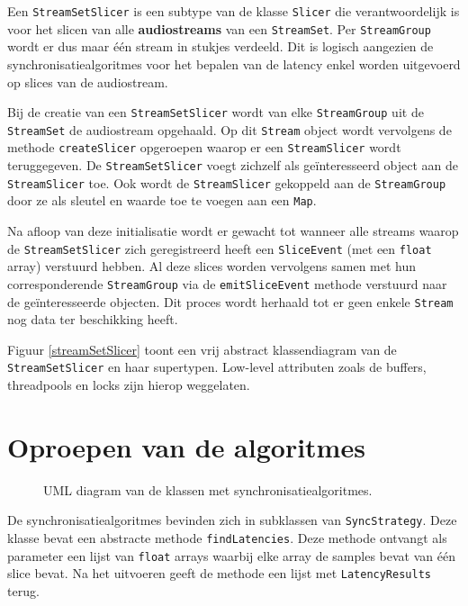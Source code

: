 Een \texttt{StreamSetSlicer} is een subtype van de klasse \texttt{Slicer} die verantwoordelijk is voor het slicen van alle \textbf{audiostreams} van een \texttt{StreamSet}. Per \texttt{StreamGroup} wordt er dus maar één stream in stukjes verdeeld. Dit is logisch aangezien de synchronisatiealgoritmes voor het bepalen van de latency enkel worden uitgevoerd op slices van de audiostream.

Bij de creatie van een \texttt{StreamSetSlicer} wordt van elke \texttt{StreamGroup} uit de \texttt{StreamSet} de audiostream opgehaald. Op dit \texttt{Stream} object wordt vervolgens de methode \texttt{createSlicer} opgeroepen waarop er een \texttt{StreamSlicer} wordt teruggegeven. De \texttt{StreamSetSlicer} voegt zichzelf als geïnteresseerd object aan de \texttt{StreamSlicer} toe. Ook wordt de \texttt{StreamSlicer}
gekoppeld aan de \texttt{StreamGroup} door ze als sleutel en waarde toe te voegen aan een \texttt{Map}.

Na afloop van deze initialisatie wordt er gewacht tot wanneer alle streams waarop de \texttt{StreamSetSlicer} zich geregistreerd heeft een \texttt{SliceEvent} (met een \texttt{float} array) verstuurd hebben. Al deze slices worden vervolgens samen met hun corresponderende \texttt{StreamGroup} via de \texttt{emitSliceEvent} methode verstuurd naar de geïnteresseerde objecten. Dit proces wordt herhaald tot er geen enkele \texttt{Stream} nog data ter beschikking heeft.

Figuur \ref{streamSetSlicer} toont een vrij abstract klassendiagram van de \texttt{StreamSetSlicer} en haar supertypen. Low-level attributen zoals de buffers, threadpools en locks zijn hierop weggelaten.

\section*{Oproepen van de algoritmes}

\begin{figure}[h!]
	\captionsetup{width=0.7\textwidth}
	\caption{UML diagram van de klassen met synchronisatiealgoritmes.}
	\begin{center}
		\advance\parskip0.3cm
		
	\end{center}
	\label{SyncStrategyUML}
\end{figure}

De synchronisatiealgoritmes bevinden zich in subklassen van \texttt{SyncStrategy}. Deze klasse bevat een abstracte methode \texttt{findLatencies}. Deze methode ontvangt als parameter een lijst van \texttt{float} arrays waarbij elke array de samples bevat van één slice bevat. Na het uitvoeren geeft de methode een lijst met \texttt{LatencyResults} terug.

